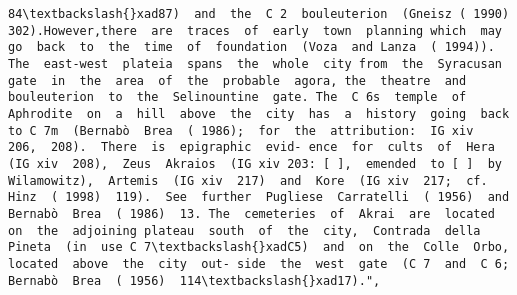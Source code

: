 \documentclass[11pt]{article}
\begin{document}
\begin{Verbatim}[commandchars=\\\{\}]
84\textbackslash{}xad87)  and  the  C 2  bouleuterion  (Gneisz ( 1990)  302).However,there  are  traces  of  early  town  planning which  may  go  back  to  the  time  of  foundation  (Voza  and Lanza  ( 1994)).  The  east-west  plateia  spans  the  whole  city from  the  Syracusan  gate  in  the  area  of  the  probable  agora, the  theatre  and  bouleuterion  to  the  Selinountine  gate. The  C 6s  temple  of  Aphrodite  on  a  hill  above  the  city  has  a  history  going  back  to C 7m  (Bernabò  Brea  ( 1986);  for  the  attribution:  IG xiv  206,  208).  There  is  epigraphic  evid- ence  for  cults  of  Hera (IG xiv  208),  Zeus  Akraios  (IG xiv 203: [ ],  emended  to [ ]  by Wilamowitz),  Artemis  (IG xiv  217)  and  Kore  (IG xiv  217;  cf. Hinz  ( 1998)  119).  See  further  Pugliese  Carratelli  ( 1956)  and Bernabò  Brea  ( 1986)  13. The  cemeteries  of  Akrai  are  located  on  the  adjoining plateau  south  of  the  city,  Contrada  della  Pineta  (in  use C 7\textbackslash{}xadC5)  and  on  the  Colle  Orbo,  located  above  the  city  out- side  the  west  gate  (C 7  and  C 6;  Bernabò  Brea  ( 1956)  114\textbackslash{}xad17).",

\end{Verbatim}
\end{document}
